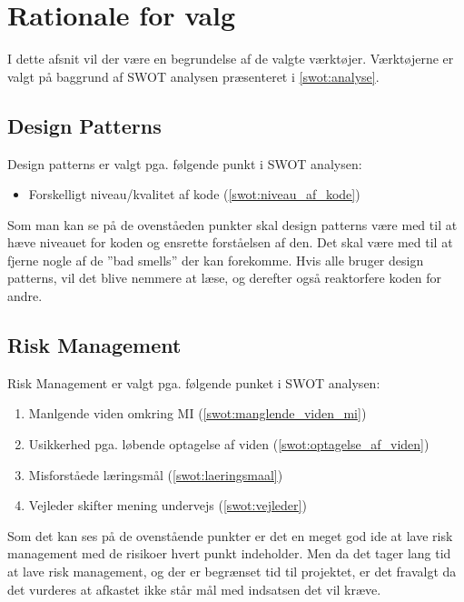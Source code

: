 \section{Rationale for valg}
I dette afsnit vil der være en begrundelse af de valgte værktøjer.
Værktøjerne er valgt på baggrund af SWOT analysen præsenteret i \cref{swot:analyse}.

\subsection{Design Patterns}\label{workshop2:designpatterns}
Design patterns er valgt pga. følgende punkt i SWOT analysen:
\begin{itemize}
\item Forskelligt niveau/kvalitet af kode (\cref{swot:niveau_af_kode})
\end{itemize}

Som man kan se på de ovenståeden punkter skal design patterns være med til at hæve niveauet for koden og ensrette forståelsen af den.
Det skal være med til at fjerne nogle af de ''bad smells'' der kan forekomme.
Hvis alle bruger design patterns, vil det blive nemmere at læse, og derefter også reaktorfere koden for andre.

\subsection{Risk Management}
Risk Management er valgt pga. følgende punket i SWOT analysen:

\begin{enumerate}
\item Manlgende viden omkring MI (\cref{swot:manglende_viden_mi})
\item Usikkerhed pga. løbende optagelse af viden (\cref{swot:optagelse_af_viden})
\item Misforståede læringsmål (\cref{swot:laeringsmaal})
\item Vejleder skifter mening undervejs (\cref{swot:vejleder})
\end{enumerate}

Som det kan ses på de ovenstående punkter er det en meget god ide at lave risk management med de risikoer hvert punkt indeholder.
Men da det tager lang tid at lave risk management, og der er begrænset tid til projektet, er det fravalgt da det vurderes at afkastet ikke står mål med indsatsen det vil kræve.